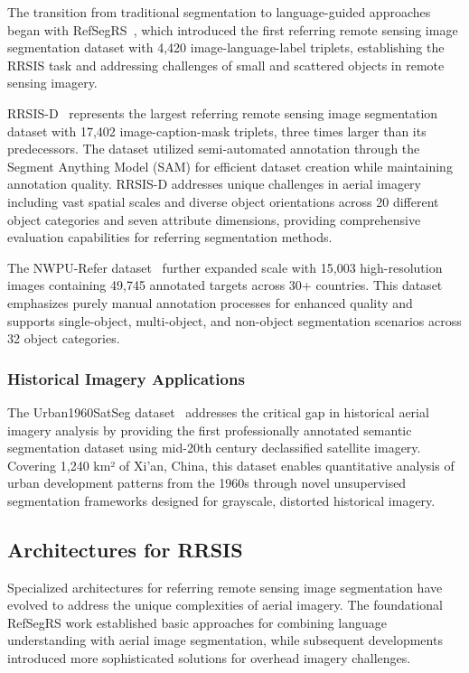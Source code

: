 The transition from traditional segmentation to language-guided approaches began with RefSegRS~\cite{yuan2023rrsis}, which introduced the first referring remote sensing image segmentation dataset with 4,420 image-language-label triplets, establishing the RRSIS task and addressing challenges of small and scattered objects in remote sensing imagery.

RRSIS-D~\cite{liu2024rotated} represents the largest referring remote sensing image segmentation dataset with 17,402 image-caption-mask triplets, three times larger than its predecessors. The dataset utilized semi-automated annotation through the Segment Anything Model (SAM) for efficient dataset creation while maintaining annotation quality. RRSIS-D addresses unique challenges in aerial imagery including vast spatial scales and diverse object orientations across 20 different object categories and seven attribute dimensions, providing comprehensive evaluation capabilities for referring segmentation methods.

The NWPU-Refer dataset~\cite{yang2024large} further expanded scale with 15,003 high-resolution images containing 49,745 annotated targets across 30+ countries. This dataset emphasizes purely manual annotation processes for enhanced quality and supports single-object, multi-object, and non-object segmentation scenarios across 32 object categories.

\subsubsection{Historical Imagery Applications}

The Urban1960SatSeg dataset~\cite{hao2025urban1960satseg} addresses the critical gap in historical aerial imagery analysis by providing the first professionally annotated semantic segmentation dataset using mid-20th century declassified satellite imagery. Covering 1,240 km² of Xi'an, China, this dataset enables quantitative analysis of urban development patterns from the 1960s through novel unsupervised segmentation frameworks designed for grayscale, distorted historical imagery.

\subsection{Architectures for RRSIS}

Specialized architectures for referring remote sensing image segmentation have evolved to address the unique complexities of aerial imagery. The foundational RefSegRS work established basic approaches for combining language understanding with aerial image segmentation, while subsequent developments introduced more sophisticated solutions for overhead imagery challenges.

